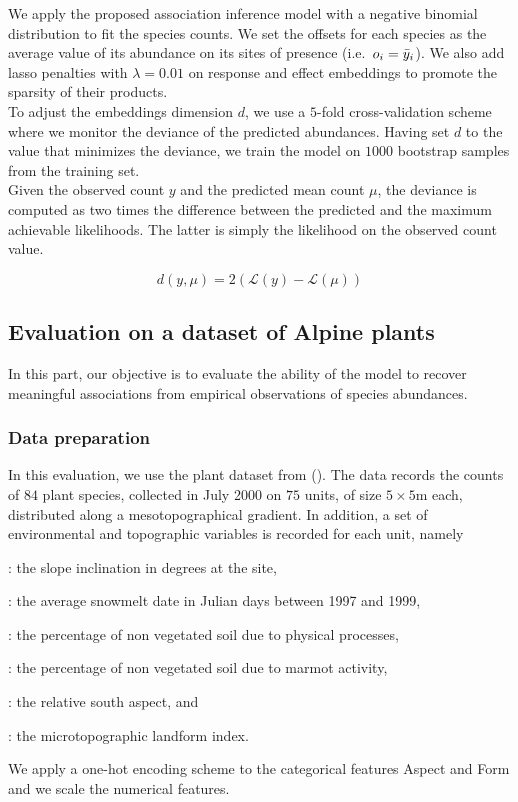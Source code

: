 \documentclass[10pt,a4paper]{article}
\begin{document}
We apply the proposed association inference model with a negative binomial distribution to fit the species counts. We set the offsets for each species as the average value of its abundance on its sites of presence (i.e.\ $o_i=\bar{y}_{i}$). We also add lasso penalties with $\lambda=0.01$ on response and effect embeddings to promote the sparsity of their products. \\

To adjust the embeddings dimension $d$, we use a $5$-fold cross-validation scheme where we monitor the deviance of the predicted abundances. Having set $d$ to the value that minimizes the deviance, we train the model on $1000$ bootstrap samples from the training set. \\

Given the observed count $y$ and the predicted mean count $\mu$, the deviance is computed as two times the difference between the predicted and the maximum achievable likelihoods. The latter is simply the likelihood on the observed count value.  

\begin{equation*}
d(y,\mu) = 2 (\mathcal{L}(y) - \mathcal{L}(\mu)) 
\end{equation*}


\subsection{Evaluation on a dataset of Alpine plants}
In this part, our objective is to evaluate the ability of the model to recover meaningful associations from empirical observations of species abundances.

\subsubsection{Data preparation}
In this evaluation, we use the plant dataset from (\cite{choler2005consistent}).  The data records the counts of $84$ plant species, collected in July 2000 on $75$ units, of size $5 \times 5$m each, distributed along a mesotopographical gradient. In addition, a set of environmental and topographic variables is recorded for each unit, namely
\begin{description}
  \setlength\itemsep{-.2em}
    \item[\trtSlope]: the slope inclination in degrees at the site,
    \item[\trtSnow]: the average snowmelt date in Julian days between 1997 and 1999,
    \item[\trtPhysD]: the percentage of non vegetated soil due to physical processes,
    \item[\trtZoogD]: the percentage of non vegetated soil due to marmot activity,
    \item[\trtAspect]: the relative south aspect, and
    \item[\trtForm]: the microtopographic landform index.
\end{description}
We apply a one-hot encoding scheme to the categorical features Aspect and Form and we scale the numerical features. 
\end{document}

